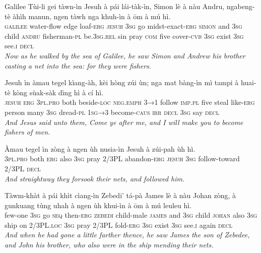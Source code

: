 \documentclass[11pt,a4paper]{article}
\begin{document}
\begin{exe}
\gll Galilee Tùi-li gei tàwn-ìn Jesuh à pái lái-tàk-ìn, Simon lè à nàu Andru, ngabeng-tè àhìh manun, ngen tàwh nga khuh-ìn à ōm à mú hì. \\
     \textsc{galilee} water-flow edge loaf-\textsc{erg} \textsc{jesuh} \textsc{3sg} go midst-exact-\textsc{erg} \textsc{simon} and \textsc{3sg} child \textsc{andru} fisherman-\textsc{pl} be.\textsc{3sg}.\textsc{rel} sin pray \textsc{com} five cover-\textsc{cvb} \textsc{3sg} exist \textsc{3sg} see.\textsc{i} \textsc{decl} \\
\glt \textcolor{kjvcolor}{\textit{Now as he walked by the sea of Galilee, he saw Simon and Andrew his brother casting a net into the sea: for they were fishers.}}

\gll Jesuh ìn àmau tegel kìang-àh, kèi hòng zúi ùn; nga mat bàng-ìn mì tampi à huai-tè kòng sùak-sàk dìng hì à cí hì. \\
     \textsc{jesuh} \textsc{erg} \textsc{3pl}.\textsc{pro} both beside-\textsc{loc} \textsc{neg}.\textsc{emph} \textsc{3→1} follow \textsc{imp}.\textsc{pl} five steal like-\textsc{erg} person many \textsc{3sg} dread-\textsc{pl} \textsc{1sg→3} become-\textsc{caus} \textsc{irr} \textsc{decl} \textsc{3sg} say \textsc{decl} \\
\glt \textcolor{kjvcolor}{\textit{And Jesus said unto them, Come ye after me, and I will make you to become fishers of men.}}

\gll Àmau tegel ìn zòng à ngen ùh nusia-ìn Jesuh à zúi-pah ùh hì. \\
     \textsc{3pl}.\textsc{pro} both \textsc{erg} also \textsc{3sg} pray 2/3PL abandon-\textsc{erg} \textsc{jesuh} \textsc{3sg} follow-toward 2/3PL \textsc{decl} \\
\glt \textcolor{kjvcolor}{\textit{And straightway they forsook their nets, and followed him.}}

\gll Tàwm-khàt à pái khìt cìang-ìn Zebedi' tá-pà James lè à nàu Johan zòng, à gunkuang tùng uhah à ngen ùh khui-ìn à ōm à mú leuleu hì. \\
     few-one \textsc{3sg} go \textsc{seq} then-\textsc{erg} \textsc{zebedi} child-male \textsc{james} and \textsc{3sg} child \textsc{johan} also \textsc{3sg} ship on 2/3PL.\textsc{loc} \textsc{3sg} pray 2/3PL fold-\textsc{erg} \textsc{3sg} exist \textsc{3sg} see.\textsc{i} again \textsc{decl} \\
\glt \textcolor{kjvcolor}{\textit{And when he had gone a little farther thence, he saw James the son of Zebedee, and John his brother, who also were in the ship mending their nets.}}


\end{exe}
\end{document}
